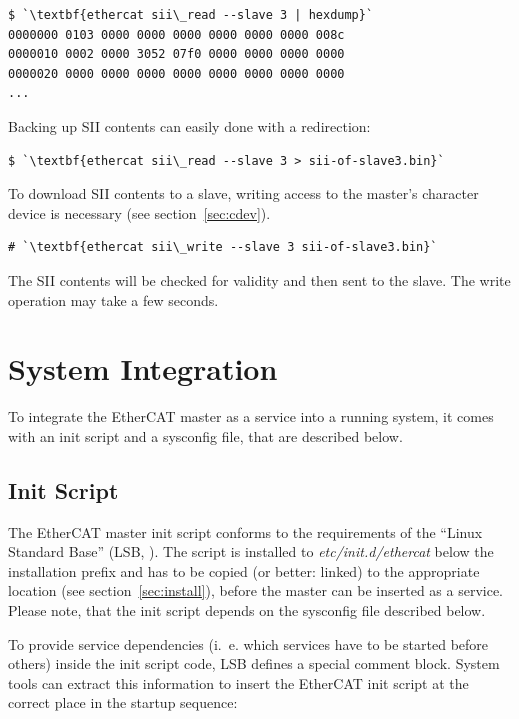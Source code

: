 \documentclass[a4paper,12pt,BCOR6mm,bibtotoc,idxtotoc]{scrbook}
\begin{document}
\begin{lstlisting}
$ `\textbf{ethercat sii\_read --slave 3 | hexdump}`
0000000 0103 0000 0000 0000 0000 0000 0000 008c
0000010 0002 0000 3052 07f0 0000 0000 0000 0000
0000020 0000 0000 0000 0000 0000 0000 0000 0000
...
\end{lstlisting}

Backing up SII contents can easily done with a redirection:

\begin{lstlisting}
$ `\textbf{ethercat sii\_read --slave 3 > sii-of-slave3.bin}`
\end{lstlisting}

To download SII contents to a slave, writing access to the master's character
device is necessary (see section~\ref{sec:cdev}).

\begin{lstlisting}
# `\textbf{ethercat sii\_write --slave 3 sii-of-slave3.bin}`
\end{lstlisting}

The SII contents will be checked for validity and then sent to the slave. The
write operation may take a few seconds.


\section{System Integration}
\label{sec:system}

To integrate the EtherCAT master as a service into a running system, it comes
with an init script and a sysconfig file, that are described below.

\subsection{Init Script}
\label{sec:init}

The EtherCAT master init script conforms to the requirements of the ``Linux
Standard Base'' (LSB, \cite{lsb}). The script is installed to
\textit{etc/init.d/ethercat} below the installation prefix and has to be copied
(or better: linked) to the appropriate location (see
section~\ref{sec:install}), before the master can be inserted as a service.
Please note, that the init script depends on the sysconfig file described
below.

To provide service dependencies (i.~e. which services have to be started before
others) inside the init script code, LSB defines a special comment block.
System tools can extract this information to insert the EtherCAT init script at
the correct place in the startup sequence:
\end{document}
